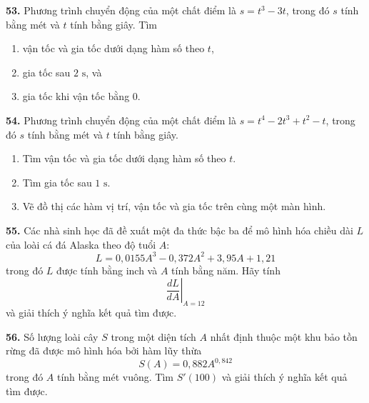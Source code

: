 \begin{minipage}[t]{0.485\textwidth}
\vspace{0.6em}
\textbf{53.} Phương trình chuyển động của một chất điểm là $s = t^3 - 3t$, trong đó $s$ tính bằng mét và $t$ tính bằng giây. Tìm
\begin{enumerate}[label=(\alph*), leftmargin=1.5em, itemsep=1pt, topsep=2pt]
  \item vận tốc và gia tốc dưới dạng hàm số theo $t$,
  \item gia tốc sau $2\text{ s}$, và
  \item gia tốc khi vận tốc bằng $0$.
\end{enumerate}

\vspace{0.35em}
\textbf{54.} Phương trình chuyển động của một chất điểm là $s = t^4 - 2t^3 + t^2 - t$, trong đó $s$ tính bằng mét và $t$ tính bằng giây.
\begin{enumerate}[label=(\alph*), leftmargin=1.5em, itemsep=1pt, topsep=2pt]
  \item Tìm vận tốc và gia tốc dưới dạng hàm số theo $t$.
  \item Tìm gia tốc sau $1\text{ s}$.
  \item[\casicon\ (c)] Vẽ đồ thị các hàm vị trí, vận tốc và gia tốc trên cùng một màn hình.
\end{enumerate}

\vspace{0.35em}
\textbf{55.} Các nhà sinh học đã đề xuất một đa thức bậc ba để mô hình hóa chiều dài $L$ của loài cá đá Alaska theo độ tuổi $A$:
\[
L = 0{,}0155A^3 - 0{,}372A^2 + 3{,}95A + 1{,}21
\]
trong đó $L$ được tính bằng inch và $A$ tính bằng năm. Hãy tính
\[
\left.\frac{dL}{dA}\right|_{A=12}
\]
và giải thích ý nghĩa kết quả tìm được.

\vspace{0.35em}
\textbf{56.} Số lượng loài cây $S$ trong một diện tích $A$ nhất định thuộc một khu bảo tồn rừng đã được mô hình hóa bởi hàm lũy thừa
\[
S(A) = 0{,}882A^{0{,}842}
\]
trong đó $A$ tính bằng mét vuông. Tìm $S'(100)$ và giải thích ý nghĩa kết quả tìm được.
\end{minipage}
